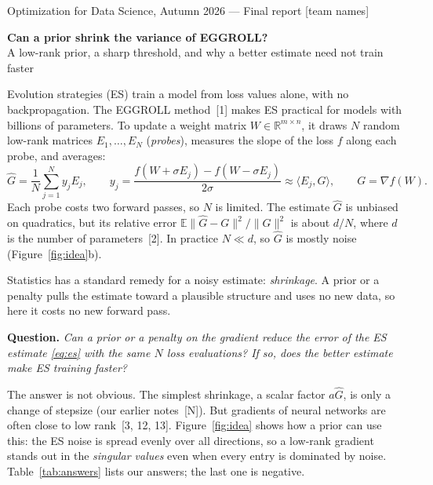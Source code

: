 \documentclass[11pt]{article}
\makeatletter
\newcommand{\R}{\mathbb{R}}
\newcommand{\E}{\mathbb{E}}
\newcommand{\ip}[2]{\langle #1,#2\rangle}
\newcommand{\Gh}{\widehat G}
\renewcommand\section{\@startsection{section}{1}{\z@}{-1.3ex plus -.3ex}{0.5ex}{\normalfont\large\bfseries}}
\makeatother
\begin{document}
{\small Optimization for Data Science, Autumn 2026 --- Final report \hfill [team names]}
\vspace{-0.4em}
\begin{center}
{\Large\textbf{Can a prior shrink the variance of EGGROLL?}}\\[0.25em]
{\large A low-rank prior, a sharp threshold, and why a better estimate need not train faster}
\end{center}
\vspace{-0.6em}

\section{Question and motivation}
Evolution strategies (ES) train a model from loss values alone, with no backpropagation. The EGGROLL method~[1] makes ES practical for models with billions of parameters. To update a weight matrix $W\in\R^{m\times n}$, it draws $N$ random low-rank matrices $E_1,\dots,E_N$ (\emph{probes}), measures the slope of the loss $f$ along each probe, and averages:
\begin{equation}\label{eq:es}
\Gh=\frac1N\sum_{j=1}^Ny_jE_j,\qquad y_j=\frac{f(W+\sigma E_j)-f(W-\sigma E_j)}{2\sigma}\approx\ip{E_j}{G},\qquad G=\nabla f(W).
\end{equation}
Each probe costs two forward passes, so $N$ is limited. The estimate $\Gh$ is unbiased on quadratics, but its relative error $\E\|\Gh-G\|^2/\|G\|^2$ is about $d/N$, where $d$ is the number of parameters~[2]. In practice $N\ll d$, so $\Gh$ is mostly noise (Figure~\ref{fig:idea}b).

Statistics has a standard remedy for a noisy estimate: \emph{shrinkage}. A prior or a penalty pulls the estimate toward a plausible structure and uses no new data, so here it costs no new forward pass.

\par\smallskip\noindent\hfil\begin{minipage}{0.93\textwidth}
\textbf{Question.} \emph{Can a prior or a penalty on the gradient reduce the error of the ES estimate \eqref{eq:es} with the same $N$ loss evaluations? If so, does the better estimate make ES training faster?}
\end{minipage}\par\smallskip

The answer is not obvious. The simplest shrinkage, a scalar factor $a\Gh$, is only a change of stepsize (our earlier notes~[N]). But gradients of neural networks are often close to low rank~[3, 12, 13]. Figure~\ref{fig:idea} shows how a prior can use this: the ES noise is spread evenly over all directions, so a low-rank gradient stands out in the \emph{singular values} even when every entry is dominated by noise. Table~\ref{tab:answers} lists our answers; the last one is negative.
\end{document}
